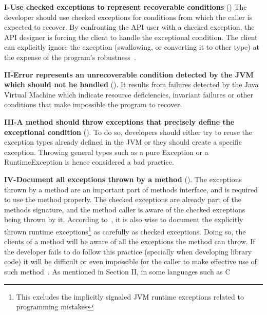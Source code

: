 \documentclass[conference]{IEEEtran}
\begin{document}

\textbf{I-Use checked exceptions to represent recoverable
conditions} (\cite{mandrioli1992advances,gosling2000java,wirfs2006toward,bloch2008effective})
The developer should use checked exceptions for conditions from which the caller
is expected to recover. By confronting the API user with a checked exception,
the API designer is forcing the client to handle the exceptional condition. The
client can explicitly ignore the exception (swallowing, or converting it to
other type) at the expense of the program's robustness~\cite{gosling2000java}.

\textbf{II-Error represents an unrecoverable condition detected by the JVM which
should not he handled} (\cite{gosling2000java}). It results from failures detected
by the Java Virtual Machine which indicate resource deficiencies, invariant
failures or other conditions that make impossible the program to recover.


\textbf{III-A method should throw exceptions that precisely define the
exceptional condition} (\cite{gosling2000java,bloch2008effective}). To do so,
developers should either try to reuse the exception types already defined in the
JVM or they should create a specific exception. Throwing general types such as a
pure Exception or a RuntimeException is hence considered a bad practice.


\textbf{ IV-Document all exceptions thrown by a
method} (\cite{mandrioli1992advances,gosling2000java,wirfs2006toward,bloch2008effective}).
The exceptions thrown by a method are an important part of methods interface,
and is required to use the method properly. The checked exceptions are already
part of the  methods signature, and the method caller is aware of the checked
exceptions being thrown by it. According to~\cite{bloch2008effective}, it is
also wise to document the explicitly thrown runtime exceptions\footnote{This
excludes the implicitly signaled JVM runtime exceptions related to programming
mistakes} as carefully as checked exceptions. Doing so, the clients of a method
will be aware of all the exceptions the method can throw. If the developer fails to
do follow this practice (specially when developing library code) it will be
difficult or even impossible for the caller to make effective use of such 
method~\cite{wirfs2006toward, bloch2008effective}. As mentioned in Section II, 
in some languages such as C
\end{document}
